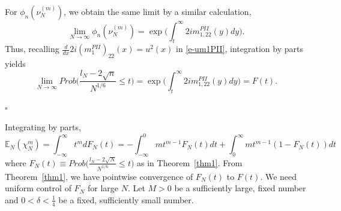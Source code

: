 \documentclass{amsart}
\theoremstyle{definition}
\theoremstyle{remark}
\numberwithin{equation}{section}
\newcommand{\E}{\mathbb E}
\begin{document}
For $\phi_n(\nu_N^{(m)})$, we obtain the same limit by a similar calculation,
\begin{equation*}
   \lim_{N\to\infty} \phi_n(\nu_N^{(m)})=
\exp\biggl(\int_{t}^{\infty} 2im^{PII}_{1,22}(y) dy\biggr).
\end{equation*}
Thus, recalling $\frac{d}{dx} 2i(m_1^{PII})_{22}(x) = u^2(x)$ in \eqref{e-um1PII}, 
integration by parts yields
\begin{equation*}
   \lim_{N\to\infty} Prob\biggl(\frac{l_N-2\sqrt{n}}{N^{1/6}}\le t\biggr)
=\exp\biggl(\int_{t}^{\infty} 2im^{PII}_{1,22}(y) dy\biggr)
=F(t).
\end{equation*}

\hfill   $\square$ 
\bigskip




   Integrating by parts,
\begin{equation*}\label{e-mon2}
   \E_N(\chi_N^m)=\int_{-\infty}^{\infty}
t^mdF_N(t)
=-\int_{-\infty}^{0} mt^{m-1}F_N(t) dt
+\int_{0}^{\infty} mt^{m-1} (1-F_N(t)) dt
\end{equation*}
where $F_N(t)\equiv Prob\biggl(\frac{l_N-2\sqrt{N}}{N^{1/6}}\le t\biggr)$
as in Theorem~\ref{thm1}.
From Theorem~\ref{thm1}, we have pointwise convergence of $F_N(t)$ to $F(t)$.
We need uniform control of $F_N$ for large $N$.
Let $M>0$ be a sufficiently large, fixed number
and $0< \delta <\frac14$ be a fixed, sufficiently small number.
\end{document}
